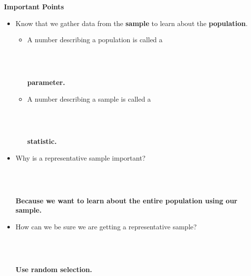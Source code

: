  \begin{center}
   {\large\bf Important Points}
 \end{center}
 \begin{itemize}
 \item Know that we gather data from the {\bf sample} to learn about
   the {\bf population}.
   \begin{itemize}
   \item A number describing a population is called a  
\begin{students}
       \\ \\
\end{students}
\begin{key}
  {\bf parameter.}
\end{key}
   \item A number describing a sample is called a  
\begin{students}
       \\ \\
\end{students}
\begin{key}
  {\bf statistic.}
\end{key}
   \end{itemize}
 \item Why is a representative sample important?  
\begin{students}
       \\ \\
\end{students}
\begin{key}
  {\bf Because we want to learn about the entire population using our sample.}
\end{key}
 \item How can we be sure we are getting a representative sample? 
\begin{students}
       \\ \\
\end{students}
\begin{key}
  {\bf Use random selection.}
\end{key}
 \end{itemize}
